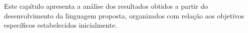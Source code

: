 Este capítulo apresenta a análise dos resultados obtidos a partir do desenvolvimento da linguagem proposta, organizados com relação aos objetivos específicos estabelecidos inicialmente. 